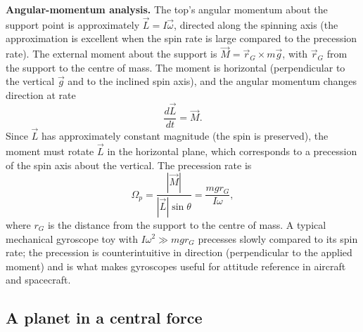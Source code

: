 \textbf{Angular-momentum analysis.} The top's angular momentum about
the support point is approximately $\vec{L} = I\vec{\omega}$,
directed along the spinning axis (the approximation is excellent
when the spin rate is large compared to the precession rate). The
external moment about the support is $\vec{M} = \vec{r}_G \times m
\vec{g}$, with $\vec{r}_G$ from the support to the centre of mass.
The moment is horizontal (perpendicular to the vertical $\vec{g}$
and to the inclined spin axis), and the angular momentum changes
direction at rate
\[
\frac{d\vec{L}}{dt} = \vec{M}.
\]
Since $\vec{L}$ has approximately constant magnitude (the spin is
preserved), the moment must rotate $\vec{L}$ in the horizontal
plane, which corresponds to a precession of the spin axis about
the vertical. The precession rate is
\[
\Omega_p = \frac{|\vec{M}|}{|\vec{L}| \sin\theta} = \frac{m g r_G}{I
\omega},
\]
where $r_G$ is the distance from the support to the centre of mass.
A typical mechanical gyroscope toy with $I\omega^2 \gg m g r_G$
precesses slowly compared to its spin rate; the precession is
counterintuitive in direction (perpendicular to the applied moment)
and is what makes gyroscopes useful for attitude reference in
aircraft and spacecraft.

\subsection{A planet in a central force}

